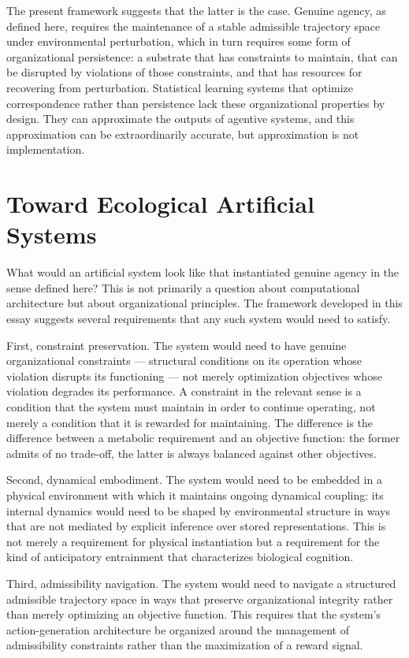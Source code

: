 \documentclass[12pt,a4paper]{report}
\theoremstyle{flyxion}
\begin{document}
The present framework suggests that the latter is the case. Genuine agency, as defined here, requires the maintenance of a stable admissible trajectory space under environmental perturbation, which in turn requires some form of organizational persistence: a substrate that has constraints to maintain, that can be disrupted by violations of those constraints, and that has resources for recovering from perturbation. Statistical learning systems that optimize correspondence rather than persistence lack these organizational properties by design. They can approximate the outputs of agentive systems, and this approximation can be extraordinarily accurate, but approximation is not implementation.

\section{Toward Ecological Artificial Systems}

What would an artificial system look like that instantiated genuine agency in the sense defined here? This is not primarily a question about computational architecture but about organizational principles. The framework developed in this essay suggests several requirements that any such system would need to satisfy.

First, constraint preservation. The system would need to have genuine organizational constraints --- structural conditions on its operation whose violation disrupts its functioning --- not merely optimization objectives whose violation degrades its performance. A constraint in the relevant sense is a condition that the system must maintain in order to continue operating, not merely a condition that it is rewarded for maintaining. The difference is the difference between a metabolic requirement and an objective function: the former admits of no trade-off, the latter is always balanced against other objectives.

Second, dynamical embodiment. The system would need to be embedded in a physical environment with which it maintains ongoing dynamical coupling: its internal dynamics would need to be shaped by environmental structure in ways that are not mediated by explicit inference over stored representations. This is not merely a requirement for physical instantiation but a requirement for the kind of anticipatory entrainment that characterizes biological cognition.

Third, admissibility navigation. The system would need to navigate a structured admissible trajectory space in ways that preserve organizational integrity rather than merely optimizing an objective function. This requires that the system's action-generation architecture be organized around the management of admissibility constraints rather than the maximization of a reward signal.
\end{document}
